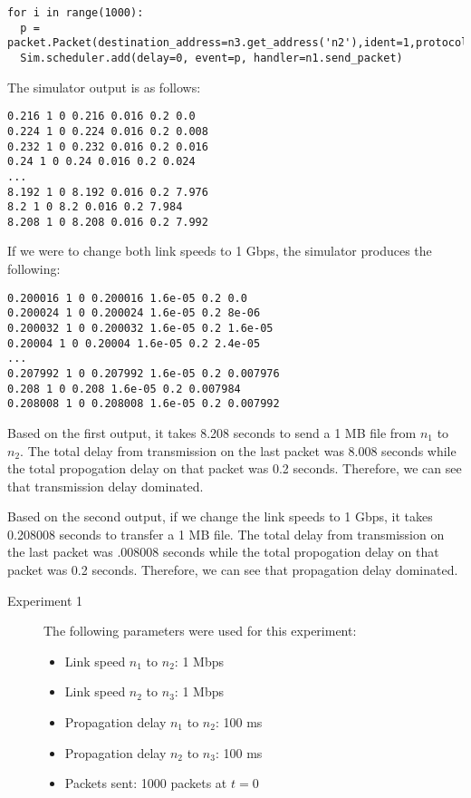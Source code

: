 \documentclass[11pt]{article}
\begin{document}
\begin{description}
\begin{lstlisting}
for i in range(1000):
  p = packet.Packet(destination_address=n3.get_address('n2'),ident=1,protocol='delay',length=1000)
  Sim.scheduler.add(delay=0, event=p, handler=n1.send_packet)
\end{lstlisting}

The simulator output is as follows:

\begin{lstlisting}
0.216 1 0 0.216 0.016 0.2 0.0
0.224 1 0 0.224 0.016 0.2 0.008
0.232 1 0 0.232 0.016 0.2 0.016
0.24 1 0 0.24 0.016 0.2 0.024
...
8.192 1 0 8.192 0.016 0.2 7.976
8.2 1 0 8.2 0.016 0.2 7.984
8.208 1 0 8.208 0.016 0.2 7.992
\end{lstlisting}

If we were to change both link speeds to 1 Gbps, the simulator produces the following:

\begin{lstlisting}
0.200016 1 0 0.200016 1.6e-05 0.2 0.0
0.200024 1 0 0.200024 1.6e-05 0.2 8e-06
0.200032 1 0 0.200032 1.6e-05 0.2 1.6e-05
0.20004 1 0 0.20004 1.6e-05 0.2 2.4e-05
...
0.207992 1 0 0.207992 1.6e-05 0.2 0.007976
0.208 1 0 0.208 1.6e-05 0.2 0.007984
0.208008 1 0 0.208008 1.6e-05 0.2 0.007992
\end{lstlisting}

Based on the first output, it takes 8.208 seconds to send a 1 MB file from $n_1$ to $n_2$. The total delay from transmission on the last packet was 8.008 seconds while the total propogation delay on that packet was 0.2 seconds. Therefore, we can see that transmission delay dominated.

Based on the second output, if we change the link speeds to 1 Gbps, it takes 0.208008 seconds to transfer a 1 MB file. The total delay from transmission on the last packet was .008008 seconds while the total propogation delay on that packet was 0.2 seconds. Therefore, we can see that propagation delay dominated.

\begin{description}
\item[Experiment 1] \hfill \break
The following parameters were used for this experiment:

\begin{itemize}
\item Link speed $n_1$ to $n_2$: 1 Mbps
\item Link speed $n_2$ to $n_3$: 1 Mbps
\item Propagation delay $n_1$ to $n_2$: 100 ms
\item Propagation delay $n_2$ to $n_3$: 100 ms
\item Packets sent: 1000 packets at $t = 0$
\end{itemize}


\end{description}
\end{description}
\end{document}
